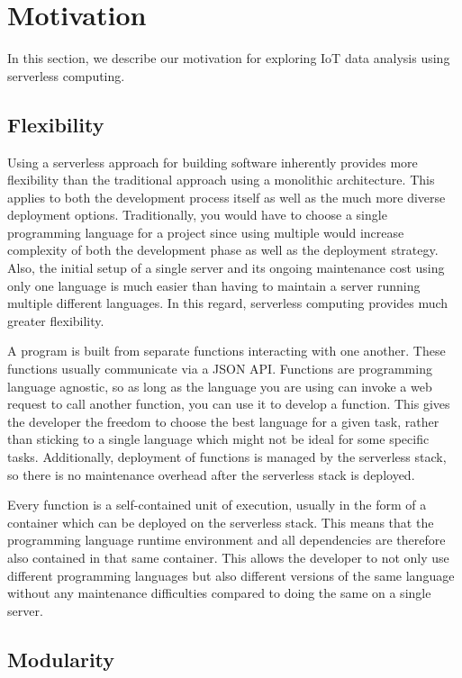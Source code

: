 \section{Motivation}

In this section, we describe our motivation for exploring IoT data analysis using serverless
computing.

\subsection{Flexibility}

Using a serverless approach for building software inherently provides more flexibility than the
traditional approach using a monolithic architecture. This applies to both the development process
itself as well as the much more diverse deployment options. Traditionally, you would have to choose
a single programming language for a project since using multiple would increase complexity of both
the development phase as well as the deployment strategy. Also, the initial setup of a single server
and its ongoing maintenance cost using only one language is much easier than having to maintain a
server running multiple different languages. In this regard, serverless computing provides much
greater flexibility.

A program is built from separate functions interacting with one another. These
functions usually communicate via a JSON API. Functions are programming language agnostic, so as
long as the language you are using can invoke a web request to call another function, you can use it
to develop a function. This gives the developer the freedom to choose the best language for a given
task, rather than sticking to a single language which might not be ideal for some specific tasks.
Additionally, deployment of functions is managed by the serverless stack, so there is no
maintenance overhead after the serverless stack is deployed.

Every function is a self-contained unit of execution, usually in the form of a container which can
be deployed on the serverless stack. This means that the programming language runtime environment
and all dependencies are therefore also contained in that same container. This allows the developer
to not only use different programming languages but also different versions of the same language
without any maintenance difficulties compared to doing the same on a single server.

\subsection{Modularity}

